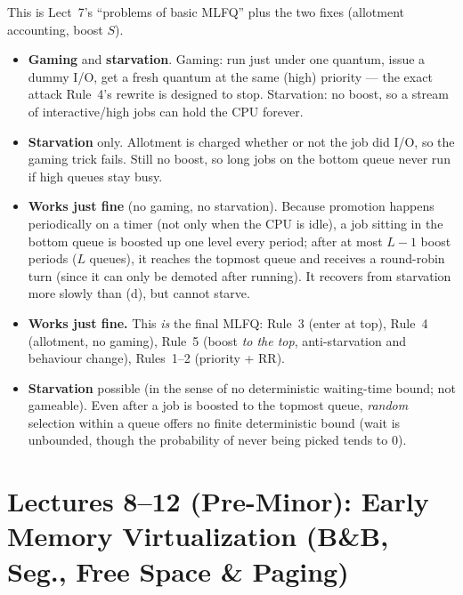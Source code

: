 \documentclass[11pt,a4paper]{article}
\newenvironment{Sol}{%
  \begin{tcolorbox}[sboxstyle, title={Solution}]%
}{%
  \end{tcolorbox}\vspace{0.35em}%
}
\begin{document}
\begin{Sol}
This is Lect~7's ``problems of basic MLFQ'' plus the two fixes (allotment accounting, boost $S$).
\begin{itemize}
  \item[(a)] \textbf{Gaming} and \textbf{starvation}. Gaming: run just under one quantum, issue a dummy I/O, get a fresh quantum at the same (high) priority --- the exact attack Rule~4's rewrite is designed to stop. Starvation: no boost, so a stream of interactive/high jobs can hold the CPU forever.
  \item[(b)] \textbf{Starvation} only. Allotment is charged whether or not the job did I/O, so the gaming trick fails. Still no boost, so long jobs on the bottom queue never run if high queues stay busy.
  \item[(c)] \textbf{Works just fine} (no gaming, no starvation). Because promotion happens periodically on a timer (not only when the CPU is idle), a job sitting in the bottom queue is boosted up one level every period; after at most $L-1$ boost periods ($L$ queues), it reaches the topmost queue and receives a round-robin turn (since it can only be demoted after running). It recovers from starvation more slowly than (d), but cannot starve.
  \item[(d)] \textbf{Works just fine.} This \emph{is} the final MLFQ: Rule~3 (enter at top), Rule~4 (allotment, no gaming), Rule~5 (boost \emph{to the top}, anti-starvation and behaviour change), Rules~1--2 (priority + RR).
  \item[(e)] \textbf{Starvation} possible (in the sense of no deterministic waiting-time bound; not gameable). Even after a job is boosted to the topmost queue, \emph{random} selection within a queue offers no finite deterministic bound (wait is unbounded, though the probability of never being picked tends to $0$).
\end{itemize}
\end{Sol}

\clearpage

\section{Lectures 8--12 (Pre-Minor): Early Memory Virtualization (B\&B, Seg., Free Space \& Paging)}
\end{document}
